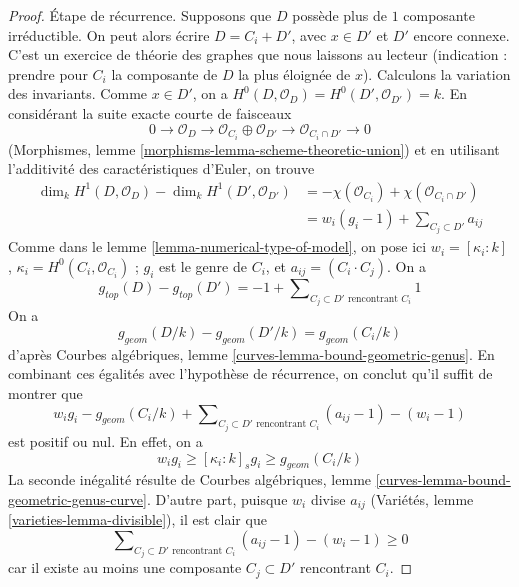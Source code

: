 \begin{proof}
\medskip\noindent
Étape de récurrence. Supposons que $D$ possède plus de $1$ composante
irréductible. On peut alors écrire $D = C_i + D'$, avec $x \in D'$ et
$D'$ encore connexe. C'est un exercice de théorie des graphes que nous
laissons au lecteur (indication : prendre pour $C_i$ la composante de $D$
la plus éloignée de $x$). Calculons la variation des invariants.
Comme $x \in D'$, on a
$H^0(D, \mathcal{O}_D) = H^0(D', \mathcal{O}_{D'}) = k$.
En considérant la suite exacte courte de faisceaux
$$
0 \to \mathcal{O}_D \to \mathcal{O}_{C_i} \oplus \mathcal{O}_{D'}
\to \mathcal{O}_{C_i \cap D'} \to 0
$$
(Morphismes, lemme \ref{morphisms-lemma-scheme-theoretic-union}) et en
utilisant l'additivité des caractéristiques d'Euler, on trouve
\begin{align*}
\dim_k H^1(D, \mathcal{O}_D) - \dim_k H^1(D', \mathcal{O}_{D'})
& =
-\chi(\mathcal{O}_{C_i}) + \chi(\mathcal{O}_{C_i \cap D'}) \\
& =
w_i(g_i - 1) + \sum\nolimits_{C_j \subset D'} a_{ij}
\end{align*}
Comme dans le lemme \ref{lemma-numerical-type-of-model}, on pose ici
$w_i = [\kappa_i : k]$, $\kappa_i = H^0(C_i, \mathcal{O}_{C_i})$ ;
$g_i$ est le genre de $C_i$, et $a_{ij} = (C_i \cdot C_j)$.
On a
$$
g_{top}(D) - g_{top}(D') = -1 +
\sum\nolimits_{C_j \subset D'\text{ rencontrant }C_i} 1
$$
On a
$$
g_{geom}(D/k) - g_{geom}(D'/k) = g_{geom}(C_i/k)
$$
d'après Courbes algébriques, lemme
\ref{curves-lemma-bound-geometric-genus}. En combinant ces égalités avec
l'hypothèse de récurrence, on conclut qu'il suffit de montrer que
$$
w_i g_i - g_{geom}(C_i/k) +
\sum\nolimits_{C_j \subset D'\text{ rencontrant } C_i} (a_{ij} - 1) - (w_i - 1)
$$
est positif ou nul. En effet, on a
\begin{equation}
\label{equation-genus-change}
w_i g_i \geq [\kappa_i : k]_s g_i \geq g_{geom}(C_i/k)
\end{equation}
La seconde inégalité résulte de Courbes algébriques, lemme
\ref{curves-lemma-bound-geometric-genus-curve}. D'autre part, puisque
$w_i$ divise $a_{ij}$ (Variétés, lemme
\ref{varieties-lemma-divisible}), il est clair que
\begin{equation}
\label{equation-change-intersections}
\sum\nolimits_{C_j \subset D'\text{ rencontrant } C_i} (a_{ij} - 1) - (w_i - 1)
\geq 0
\end{equation}
car il existe au moins une composante $C_j \subset D'$ rencontrant $C_i$.
\end{proof}

